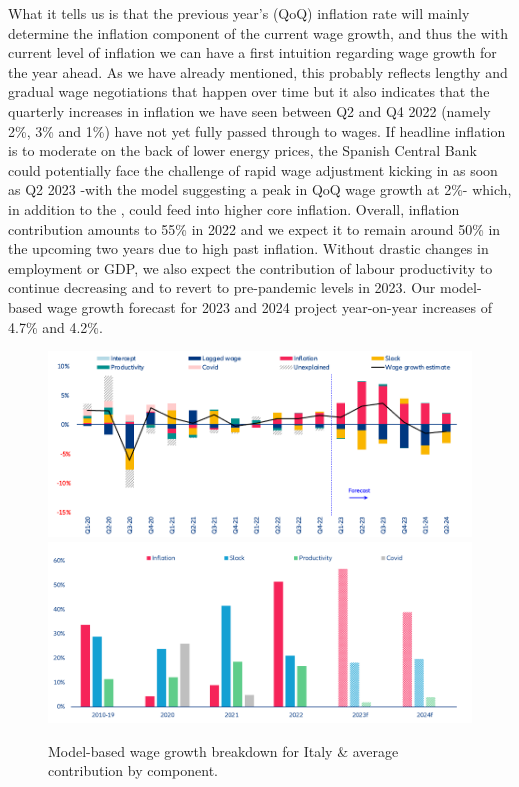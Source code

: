 What it tells us is that the previous year's (QoQ) inflation rate will mainly determine the inflation component of the current wage growth, and thus the with current level of inflation we can have a first intuition regarding wage growth for the year ahead. 
As we have already mentioned, this probably reflects lengthy and gradual wage negotiations that happen over time but it also indicates that the quarterly increases in inflation we have seen between Q2 and Q4 2022 (namely 2\%, 3\% and 1\%) have not yet fully passed through to wages. 
If headline inflation is to moderate on the back of lower energy prices, the Spanish Central Bank could potentially face the challenge of rapid wage adjustment kicking in as soon as Q2 2023 -with the model suggesting a peak in QoQ wage growth at 2\%- which, in addition to the , could feed into higher core inflation. 
Overall, inflation contribution amounts to 55\% in 2022 and we expect it to remain around 50\% in the upcoming two years due to high past inflation. 
Without drastic changes in employment or GDP, we also expect the contribution of labour productivity to continue decreasing and to revert to pre-pandemic levels in 2023. 
Our model-based wage growth forecast for 2023 and 2024 project year-on-year increases of 4.7\% and 4.2\%.

\begin{figure}[H]
    \centering
    \caption{Model-based wage growth breakdown for Italy \& average contribution by component.}
    \includegraphics[width=.8\textwidth]{Core/2.Labour/img/italyb1.png}
    \includegraphics[width=.8\textwidth]{Core/2.Labour/img/italyb2.png}
    \label{figure:itbreakdown}
\end{figure}
\newpage

